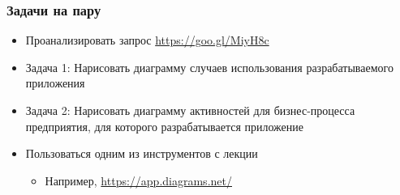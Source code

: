\documentclass{../../slides-style}
\begin{document}
    \begin{frame}
        \frametitle{Задачи на пару}
        \begin{itemize}
            \item Проанализировать запрос \url{https://goo.gl/MiyH8c}
            \item Задача 1: Нарисовать диаграмму случаев использования разрабатываемого приложения
            \item Задача 2: Нарисовать диаграмму активностей для бизнес-процесса предприятия, для которого разрабатывается приложение
            \item Пользоваться одним из инструментов с лекции
            \begin{itemize}
                \item Например, \url{https://app.diagrams.net/}
            \end{itemize}
        \end{itemize}
    \end{frame}
\end{document}
